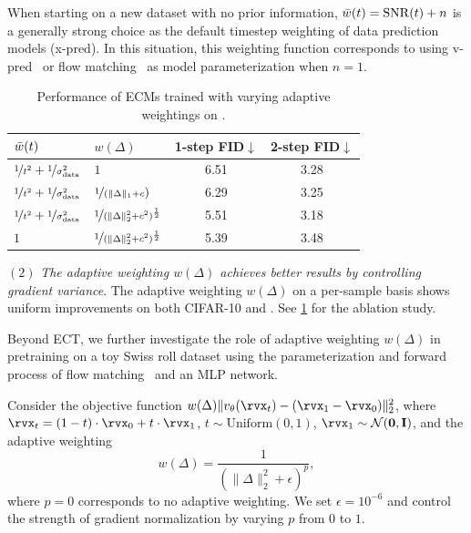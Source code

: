 When starting on a new dataset with no prior information, $\Bar{w}(t) = \mathrm{SNR}(t)+n$ is a generally strong choice as the default timestep weighting of data prediction models (x-pred). In this situation, this weighting function corresponds to using v-pred~\citep{salimans2022progressive} or flow matching~\citep{lipman2022flow,liu2022flow} as model parameterization when $n=1$.

\begin{table}[t!]
\caption{Performance of ECMs trained with varying adaptive weightings on \imgnet.}
\vspace{5pt}
\centering
\begin{tabular}{@{}llcc@{}} 
\toprule
$\Bar{w}(t)$ & $w(\Delta)$ & 1-step FID$\downarrow$ & 2-step FID$\downarrow$ \\ 
\midrule
$\nicefrac{1}{t^2}+\nicefrac{1}{\sigma_{\mathrm{data}}^2}$ & $1$ & 6.51   & 3.28     \\
$\nicefrac{1}{t^2}+\nicefrac{1}{\sigma_{\mathrm{data}}^2}$ & $\nicefrac{1}{(\|\Delta\|_1 + c})$          & 6.29	 & 3.25	 \\
$\nicefrac{1}{t^2}+\nicefrac{1}{\sigma_{\mathrm{data}}^2}$ &  $\nicefrac{1}{(\|\Delta\|_2^2 + c^2)^{\frac{1}{2}}}$ & 5.51   & 3.18     \\
$1$ & $\nicefrac{1}{(\|\Delta\|_2^2 + c^2)^{\frac{1}{2}}}$ &  5.39  & 3.48 \\
\bottomrule
\end{tabular}
\label{tab:adaptive-wt-imgnet}
\end{table}
\vspace{0.2cm}

$(2)$ \textit{The adaptive weighting $w(\Delta)$ achieves better results by controlling gradient variance}. The adaptive weighting $w(\Delta)$ on a per-sample basis shows uniform improvements on both CIFAR-10 and \imgnet. See \cref{tab:adaptive-wt-imgnet} for the ablation study. 

Beyond ECT, we further investigate the role of adaptive weighting \( w(\Delta) \) in pretraining on a toy Swiss roll dataset using the parameterization and forward process of flow matching~\citep{lipman2022flow} and an MLP network.

Consider the objective function \( w(\Delta) \|v_\theta(\x_t) - (\x_1 - \x_0) \|_2^2 \), where \( \x_t = (1-t) \cdot \x_0 + t \cdot \x_1 \), \(t \sim \mathrm{Uniform}(0, 1)\), \( \x_1 \sim \mathcal{N}(\mathbf{0}, \mathbf{I})\), and the adaptive weighting
\[
w(\Delta) = \frac{1}{(\|\Delta\|_2^2 + \epsilon)^p},
\]
where \( p=0 \) corresponds to no adaptive weighting. We set \( \epsilon = 10^{-6} \) and control the strength of gradient normalization by varying \( p \) from $0$ to $1$.

